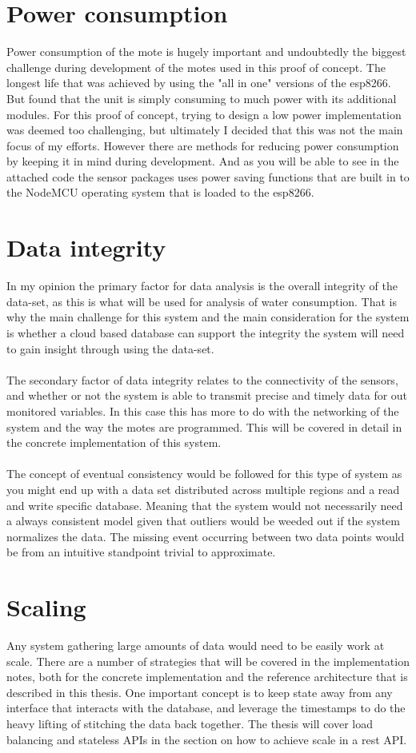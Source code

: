 \documentclass[]{uiophd}
\begin{document}
\section{Power consumption}
Power consumption of the mote is hugely important and undoubtedly the biggest challenge during development of the motes used in this proof of concept. The longest life that was achieved by using the "all in one" versions of the esp8266. But found that the unit is simply consuming to much power with its additional modules. For this proof of concept, trying to design a low power implementation was deemed too challenging, but ultimately I decided that this was not the main focus of my efforts. However there are methods for reducing power consumption by keeping it in mind during development. And as you will be able to see in the attached code the sensor packages uses power saving functions that are built in to the NodeMCU operating system that is loaded to the esp8266.
\section{Data integrity}
In my opinion the primary factor for data analysis is the overall integrity of the data-set, as this is what will be used for analysis of water consumption. That is why the main challenge for this system and the main consideration for the system is whether a cloud based database can support the integrity the system will need to gain insight through using the data-set. 
\\\\
The secondary factor of data integrity relates to the connectivity of the sensors, and whether or not the system is able to transmit precise and timely data for out monitored variables. In this case this has  more to do with the networking of the system and the way the motes are programmed. This will be covered in detail in the concrete implementation of this system.
\\\\
The concept of eventual consistency would be followed for this type of system as you might end up with a data set distributed across multiple regions and a read and write specific database. Meaning that the system would not necessarily need a always consistent model given that outliers would be weeded out if the system normalizes the data. The missing event occurring between two data points would be from an intuitive standpoint trivial to approximate.
\section{Scaling}
Any system gathering large amounts of data would need to be easily work at scale. There are a number of strategies that will be covered in the implementation notes, both for the concrete implementation and the reference architecture that is described in this thesis. One important concept is to keep state away from any interface that interacts with the database, and leverage the timestamps to do the heavy lifting of stitching the data back together. The thesis will cover load balancing and stateless APIs in the section on how to achieve scale in a rest API.
\end{document}
